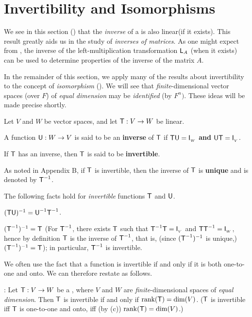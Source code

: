 \section{Invertibility and Isomorphisms} \label{sec 2.4}

We see in this section () that the \emph{inverse} of a \LTRAN{} is also linear(if it exists).
This result greatly aids us in the study of \emph{inverses of matrices}.
As one might expect from , the inverse of the left-multiplication transformation \(\textsf{L}_A\) (when it exists) can be used to determine properties of the inverse of the matrix \(A\).

In the remainder of this section, we apply many of the results about invertibility to the concept of \emph{isomorphism} ().
We will see that \emph{finite}-dimensional vector spaces (over \(F\)) of \emph{equal dimension} may be \emph{identified} (by \(F^n)\).
These ideas will be made precise shortly.

\begin{definition} \label{def 2.12}
Let \(V\) and \(W\) be vector spaces, and let \(\textsf{T} : V \to W\) be linear.

 A function \(\textsf{U}: W \to V\) is said to be an \textbf{inverse} of \(\textsf{T}\) if \(\textsf{T}\textsf{U} = \textsf{I}_{_W}\) \textbf{and} \(\textsf{U}\textsf{T} = \textsf{I}_{_V}\).

 If \(\textsf{T}\) has an inverse, then \(\textsf{T}\) is said to be \textbf{invertible}.

 As noted in Appendix B, if \(\textsf{T}\) is invertible, then the inverse of \(\textsf{T}\) is \textbf{unique} and is denoted by \(\textsf{T}^{-1}\).
\end{definition}

\begin{additional theorem} \label{athm 2.35}
The following facts hold for \emph{invertible} functions \(\textsf{T}\) and \(\textsf{U}\).

 \((\textsf{T}\textsf{U})^{-1} = \textsf{U}^{-1} \textsf{T}^{-1}\).

 \((\textsf{T}^{-1})^{-1} = \textsf{T}\)
(For \(\textsf{T}^{-1}\), there exists \(\textsf{T}\) such that \(\textsf{T}^{-1}\textsf{T} = \textsf{I}_{_V}\) and \(\textsf{T}\textsf{T}^{-1} = \textsf{I}_{_W}\),
hence by definition \(\textsf{T}\) is the inverse of \(\textsf{T}^{-1}\), that is, (since \((\textsf{T}^{-1})^{-1}\) is unique,) \((\textsf{T}^{-1})^{-1} = \textsf{T}\));
in particular, \(\textsf{T}^{-1}\) is invertible.

We often use the fact that a function is invertible if and only if it is both one-to-one and onto.
We can therefore restate  as follows.

: Let \(\textsf{T} : V \to W\) be a \LTRAN{}, where \(V\) and \(W\) are \emph{finite}-dimensional spaces of \emph{equal dimension}.
Then \(\textsf{T}\) is invertible if and only if \(\mathrm{rank}(\textsf{T}) = \dim(V)\).
(\(\textsf{T}\) is invertible iff \(\textsf{T}\) is one-to-one and onto, iff (by (c)) \(\mathrm{rank}(\textsf{T}) = \dim(V)\).)
\end{additional theorem}

